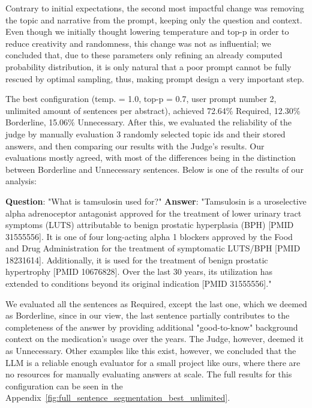 Contrary to initial expectations, the second most impactful change was removing the topic and narrative from the prompt, keeping only the question and context. Even though we initially thought lowering temperature and top-p in order to reduce creativity and randomness, this change was not as influential; we concluded that, due to these parameters only refining an already computed probability distribution, it is only natural that a poor prompt cannot be fully rescued by optimal sampling, thus, making prompt design a very important step.

The best configuration (temp. = 1.0, top-p = 0.7, user prompt number 2, unlimited amount of sentences per abstract), achieved 72.64\% Required, 12.30\% Borderline, 15.06\% Unnecessary. After this, we evaluated the reliability of the judge by manually evaluation 3 randomly selected topic ids and their stored answers, and then comparing our results with the Judge's results. Our evaluations mostly agreed, with most of the differences being in the distinction between Borderline and Unnecessary sentences. Below is one of the results of our analysis:

\textbf{Question}: "What is tamsulosin used for?" \textbf{Answer}: "Tamsulosin is a uroselective alpha adrenoceptor antagonist approved for the treatment of lower urinary tract symptoms (LUTS) attributable to benign prostatic hyperplasia (BPH) [PMID 31555556]. It is one of four long-acting alpha 1 blockers approved by the Food and Drug Administration for the treatment of symptomatic LUTS/BPH [PMID 18231614]. Additionally, it is used for the treatment of benign prostatic hypertrophy [PMID 10676828]. Over the last 30 years, its utilization has extended to conditions beyond its original indication [PMID 31555556]."

We evaluated all the sentences as Required, except the last one, which we deemed as Borderline, since in our view, the last sentence partially contributes to the completeness of the answer by providing additional "good-to-know" background context on the medication's usage over the years. The Judge, however, deemed it as Unnecessary. Other examples like this exist, however, we concluded that the LLM is a reliable enough evaluator for a small project like ours, where there are no resources for manually evaluating answers at scale. The full results for this configuration can be seen in the Appendix~\ref{fig:full_sentence_segmentation_best_unlimited}.

